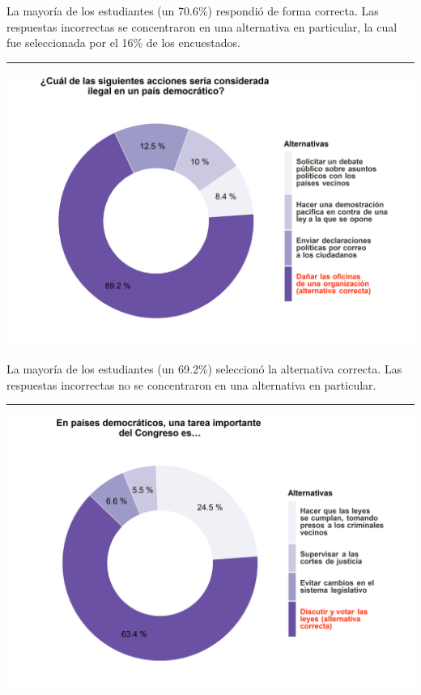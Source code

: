 \documentclass[
  14pt,
]{book}
\let\origfigure\figure
\let\endorigfigure\endfigure
\renewenvironment{figure}[1][2] {
  \expandafter\origfigure\expandafter[H]
} {
  \endorigfigure
}
\begin{document}
La mayoría de los estudiantes (un 70.6\%) respondió de forma correcta. Las respuestas incorrectas se concentraron en una alternativa en particular, la cual fue seleccionada por el 16\% de los encuestados.

\begin{center}\rule{0.5\linewidth}{0.5pt}\end{center}

\begin{figure}[!ht]

{\centering \includegraphics[width=0.8\linewidth,]{images/ccivico_3} 

}

\caption{Acción ilegal en un país democrático}\label{fig:unnamed-chunk-7}
\end{figure}

La mayoría de los estudiantes (un 69.2\%) seleccionó la alternativa correcta. Las respuestas incorrectas no se concentraron en una alternativa en particular.

\begin{center}\rule{0.5\linewidth}{0.5pt}\end{center}

\begin{figure}[!ht]

{\centering \includegraphics[width=0.8\linewidth,]{images/ccivico_4} 

}

\caption{Actividad principal del Congreso}\label{fig:unnamed-chunk-8}
\end{figure}
\end{document}
